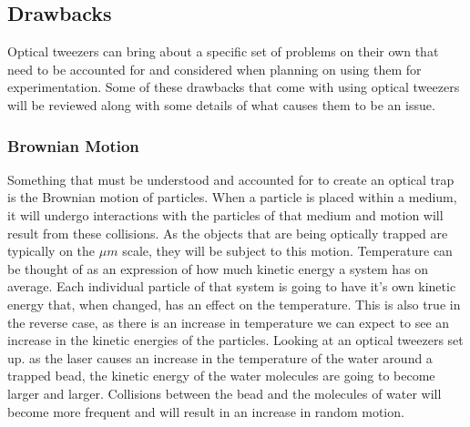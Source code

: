 \documentclass[%
 aip,
 amsmath,amssymb,
 reprint,%
]{revtex4-1}
\begin{document}
    \subsection{\label{sec:level2}Drawbacks}
    Optical tweezers can bring about a specific set of problems on their own that need to be accounted for and considered when planning on using them for experimentation. Some of these drawbacks that come with using optical tweezers will be reviewed along with some details of what causes them to be an issue. 

        \subsubsection{\label{sec:level3}Brownian Motion}
    Something that must be understood and accounted for to create an optical trap is the Brownian motion of particles. When a particle is placed within a medium, it will undergo interactions with the particles of that medium and motion will result from these collisions\cite{brownian}. As the objects that are being optically trapped are typically on the $\mu m$ scale, they will be subject to this motion. Temperature can be thought of as an expression of how much kinetic energy a system has on average. Each individual particle of that system is going to have it's own kinetic energy that, when changed, has an effect on the temperature. This is also true in the reverse case, as there is an increase in temperature we can expect to see an increase in the kinetic energies of the particles. Looking at an optical tweezers set up. as the laser causes an increase in the temperature of the water around a trapped bead, the kinetic energy of the water molecules are going to become larger and larger. Collisions between the bead and the molecules of water will become more frequent and will result in an increase in random motion. 
    
\end{document}
